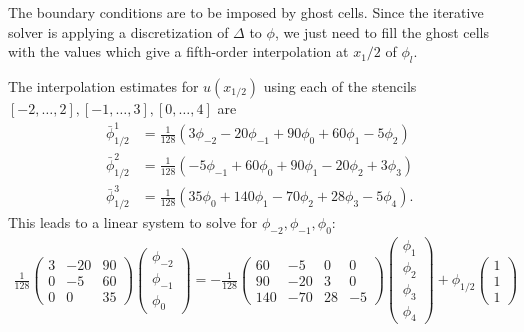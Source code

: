 \documentclass{article}
\begin{document}
The boundary conditions are to be imposed by ghost cells.
Since the iterative solver is applying a discretization of $\Delta$ to $\phi$,
we just need to fill the ghost cells with the values which give a fifth-order
interpolation at $x_1/2$ of $\phi_l$.

The interpolation estimates for $u(x_{1/2})$ using each of the stencils
$[-2, \dots, 2], [-1, \dots, 3], [0, \dots, 4]$ are
\begin{align*}
    \bar{\phi}_{1/2}^1 &= \frac{1}{128}(3\phi_{-2} - 20\phi_{-1} + 90\phi_0 + 60\phi_1 - 5\phi_2) \\
    \bar{\phi}_{1/2}^2 &= \frac{1}{128}(-5\phi_{-1} + 60\phi_0 + 90\phi_1 - 20\phi_2 + 3\phi_3) \\
    \bar{\phi}_{1/2}^3 &= \frac{1}{128}(35\phi_0 + 140\phi_1 - 70\phi_2 + 28\phi_3 - 5\phi_4).
\end{align*}
This leads to a linear system to solve for $\phi_{-2}, \phi_{-1}, \phi_0$:
\begin{align*}
\frac{1}{128}\begin{pmatrix}
    3 & -20 & 90 \\
    0 & -5 & 60 \\
    0 & 0 & 35
\end{pmatrix} \begin{pmatrix}
    \phi_{-2} \\ \phi_{-1} \\ \phi_0
\end{pmatrix}
=
-\frac{1}{128}
\begin{pmatrix}
    60 & -5 & 0 & 0 \\
    90 & -20 & 3 & 0 \\
    140 & -70 & 28 & -5
\end{pmatrix}
\begin{pmatrix}
\phi_1 \\ \phi_2 \\ \phi_3 \\ \phi_4
\end{pmatrix} + \phi_{1/2}\begin{pmatrix}
1 \\ 1 \\ 1
\end{pmatrix}
\end{align*}
\end{document}
